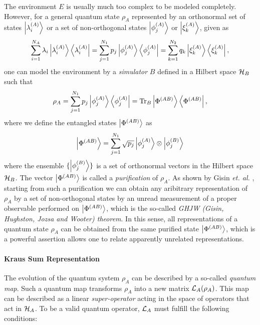 The environment $E$ is usually much too complex to be modeled completely. However, for a general quantum state $\rho_A$ represented by an orthonormal set of states $\left| \lambda_i^{(A)} \right>$ or a set of non-orthogonal states $\left| \phi_j^{(A)} \right>$ or $\left| \xi_k^{(A)} \right>$, given as 
%
\begin{equation}
\sum\limits_{i=1}^{N_A}\lambda_i\left| \lambda_i^{(A)} \right>\left< \lambda_i^{(A)} \right| = \sum\limits_{j=1}^{N_1}p_j\left| \phi_j^{(A)} \right>\left< \phi_j^{(A)} \right| = \sum\limits_{k=1}^{N_2}q_k\left| \xi_k^{(A)} \right>\left< \xi_k^{(A)} \right|,
\end{equation}
%
one can model the environment by a {\it simulator} $B$ defined in a Hilbert space $\begin{mathcal}H\end{mathcal}_B$ such that
%
\begin{equation}
\rho_A = \sum\limits_{j=1}^{N_1}p_j\left| \phi_j^{(A)} \right>\left< \phi_j^{(A)} \right| = \mathrm{Tr}_B \left| \Phi^{(AB)} \right>\left< \Phi^{(AB)} \right|,
\end{equation}
%
where we define the entangled states $\left| \Phi^{(AB)} \right>$ as
%
\begin{equation}
\left| \Phi^{(AB)} \right> = \sum\limits_{j=1}^{N_1}\sqrt{p_j}\left| \phi_j^{(A)} \right>\otimes\left| \phi_j^{(B)} \right>
\end{equation}
%
where the ensemble $\{\left| \phi_j^{(B)} \right>\}$ is a set of orthonormal vectors in the Hilbert space $\begin{mathcal}H\end{mathcal}_B$. The vector $\left| \Phi^{(AB)} \right>$ is called a {\it purification} of $\rho_A$. As shown by Gisin {\it et. al.} \citep{gisin_stochastic_1989,hughston_complete_1993}, starting from such a purification we can obtain any aribitrary representation of $\rho_A$ by a set of non-orthogonal states by an unread measurement of a proper observable performed on $\left| \Phi^{(AB)} \right>$, which is the so-called {\it GHJW (Gisin, Hughston, Jozsa and Wooter) theorem}. In this sense, all representations of a quantum state $\rho_A$ can be obtained from the same purified state $\left| \Phi^{(AB)} \right>$, which is a powerful assertion allows one to relate apparently unrelated representations.

\smallskip

\paragraph{Kraus Sum Representation} The evolution of the quantum system $\rho_A$ can be described by a so-called {\it quantum map}. Such a quantum map transforms $\rho_A$ into a new matrix $\LA(\rho_A)$. This map can be described as a linear {\it super-operator} acting in the space of operators that act in $\begin{mathcal}H\end{mathcal}_A$. To be a valid quantum operator, $\begin{mathcal}L\end{mathcal}_A$ must fulfill the following conditions:

